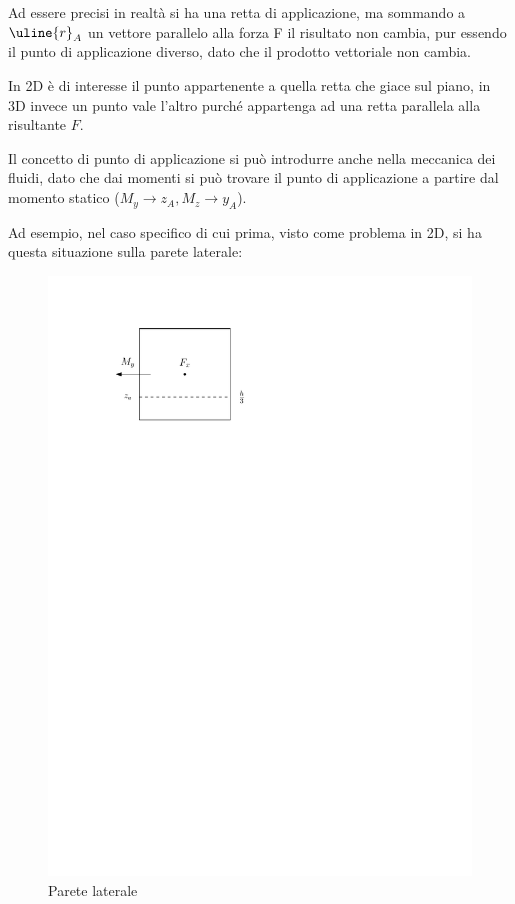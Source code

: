 Ad essere precisi in realtà si ha una retta di applicazione, ma sommando a $\uline{r}_A$ un vettore parallelo alla forza F il risultato non cambia, pur essendo il punto di applicazione diverso, dato che il prodotto vettoriale non cambia.

In 2D è di interesse il punto appartenente a quella retta che giace sul piano, in 3D invece un punto vale l'altro purché appartenga ad una retta parallela alla risultante $F$.

Il concetto di punto di applicazione si può introdurre anche nella meccanica dei fluidi, dato che dai momenti si può trovare il punto di applicazione a partire dal momento statico ($M_y \rightarrow z_A, M_z \rightarrow y_A$).

Ad esempio, nel caso specifico di cui prima, visto come problema in 2D, si ha questa situazione sulla parete laterale:
	\begin{figure}[ht]
		\includegraphics[scale=0.90]{./2.4 Spinte sulle superfici/2.4-4}
		\centering
		\caption{Parete laterale}
	\end{figure}	
